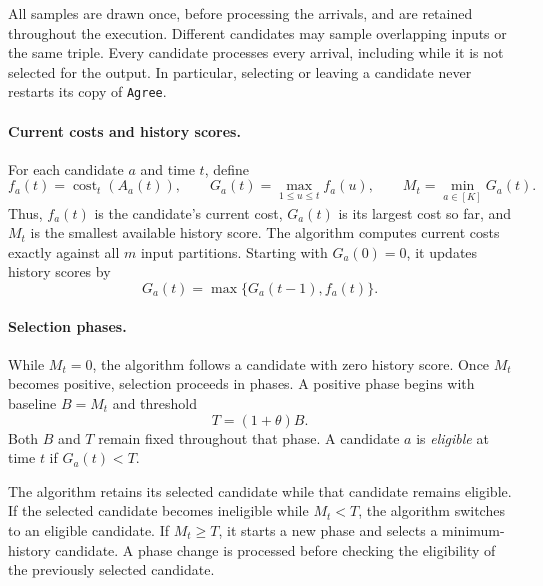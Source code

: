 \documentclass[11pt]{article}
\theoremstyle{definition}
\theoremstyle{remark}
\newcommand{\1}{\mathbf{1}}
\begin{document}
All samples are drawn once, before processing the arrivals, and are
retained throughout the execution. Different candidates may sample
overlapping inputs or the same triple. Every candidate processes every
arrival, including while it is not selected for the output. In
particular, selecting or leaving a candidate never restarts its copy
of \texttt{Agree}.

\paragraph{Current costs and history scores.}
For each candidate $a$ and time $t$, define
\[
    f_a(t)=\operatorname{cost}_t(A_a(t)),
    \qquad
    G_a(t)=\max_{1\leq u\leq t} f_a(u),
    \qquad
    M_t=\min_{a\in[K]}G_a(t).
\]
Thus, $f_a(t)$ is the candidate's current cost, $G_a(t)$ is its largest
cost so far, and $M_t$ is the smallest available history score.
The algorithm computes current costs exactly against all $m$ input
partitions. Starting with $G_a(0)=0$, it updates history scores by
\[
    G_a(t)=\max\{G_a(t-1),f_a(t)\}.
\]

\paragraph{Selection phases.}
While $M_t=0$, the algorithm follows a candidate with zero history
score. Once $M_t$ becomes positive, selection proceeds in phases.
A positive phase begins with baseline $B=M_t$ and threshold
\[
    T=(1+\theta)B.
\]
Both $B$ and $T$ remain fixed throughout that phase. A candidate $a$
is \emph{eligible} at time $t$ if $G_a(t)<T$.

The algorithm retains its selected candidate while that candidate
remains eligible. If the selected candidate becomes ineligible while
$M_t<T$, the algorithm switches to an eligible candidate. If
$M_t\geq T$, it starts a new phase and selects a minimum-history
candidate. A phase change is processed before checking the eligibility
of the previously selected candidate.
\end{document}

